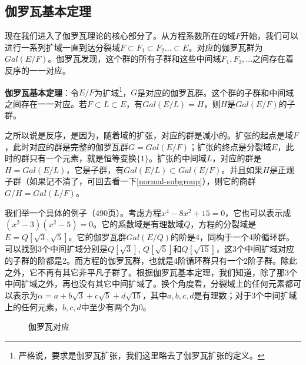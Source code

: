 \documentclass{article}
\begin{document}
\subsection{伽罗瓦基本定理}

现在我们进入了伽罗瓦理论的核心部分了。从方程系数所在的域$F$开始，我们可以进行一系列扩域一直到达分裂域$F \subset F_1 \subset F_2 ... \subset E$。对应的伽罗瓦群为$Gal(E/F)$。伽罗瓦发现，这个群的所有子群和这些中间域$F_1, F_2, ...$之间存在着反序的一一对应。

\begin{theorem}
\textbf{伽罗瓦基本定理}：令$E/F$为扩域\footnote{严格说，要求是伽罗瓦扩张，我们这里略去了伽罗瓦扩张的定义。}，$G$是对应的伽罗瓦群。这个群的子群和中间域之间存在一一对应。若$F \subset L \subset E$，有$Gal(E/L) = H$，则$H$是$Gal(E/F)$的子群。
\end{theorem}

之所以说是反序，是因为，随着域的扩张，对应的群是减小的。扩张的起点是域$F$，此时对应的群是完整的伽罗瓦群$G = Gal(E/F)$；扩张的终点是分裂域$E$，此时的群只有一个元素，就是恒等变换$\{1\}$。扩张的中间域$L$，对应的群是$H = Gal(E/L)$，它是子群，有$Gal(E/L) \subset Gal(E/F)$。并且如果$H$是正规子群（如果记不清了，可回去看一下\ref{normal-subgroup}），则它的商群$G/H = Gal(L/F)$。

我们举一个具体的例子\cite{MArtin}（490页）。考虑方程$x^4 - 8x^2 + 15 = 0$，它也可以表示成$(x^2 - 3)(x^2 - 5) = 0$。它的系数域是有理数域$Q$，方程的分裂域是$E = Q[\sqrt{3}, \sqrt{5}]$。它的伽罗瓦群$Gal(E/Q)$的阶是4，同构于一个4阶循环群。可以找到3个中间扩域分别是$Q[\sqrt{3}]$, $Q[\sqrt{5}]$和$Q[\sqrt{15}]$，这3个中间扩域对应的子群的阶都是2。而方程的伽罗瓦群，也就是4阶循环群只有一个2阶子群。除此之外，它不再有其它非平凡子群了。根据伽罗瓦基本定理，我们知道，除了那3个中间扩域之外，再也没有其它中间扩域了。换个角度看，分裂域上的任何元素都可以表示为$\alpha = a + b\sqrt{3} + c\sqrt{5} + d\sqrt{15}$，其中$a, b, c, d$是有理数；对于3个中间扩域上的任何元素，$b, c, d$中至少有两个为0。

\begin{figure}[htbp]
\centering
{}
\caption{伽罗瓦对应}
\label{fig:Galois-Correspondence}
\end{figure}
\end{document}
